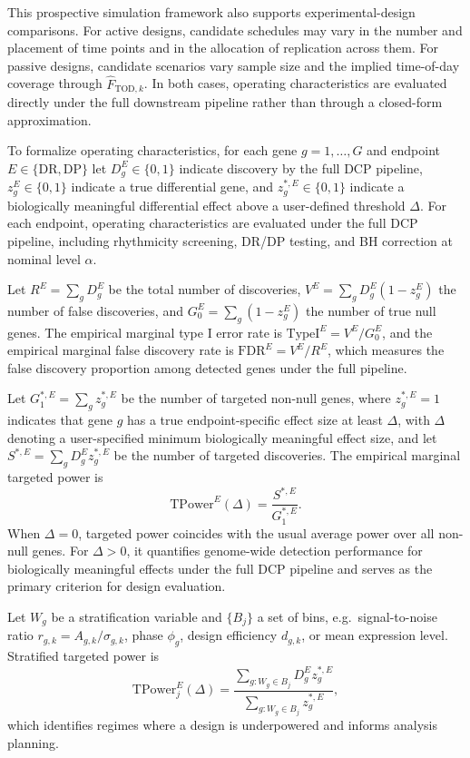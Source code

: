 \documentclass{article}
\begin{document}
This prospective simulation framework also supports experimental-design
comparisons. For active designs, candidate schedules may vary in the number and
placement of time points and in the allocation of replication across them. For
passive designs, candidate scenarios vary sample size and the implied
time-of-day coverage through $\hat{F}_{\mathrm{TOD},k}$. In both cases,
operating characteristics are evaluated directly under the full downstream
pipeline rather than through a closed-form approximation.

To formalize operating characteristics, for each gene $g=1,\ldots,G$ and
endpoint $E\in\{\mathrm{DR},\mathrm{DP}\}$ let $D_g^E\in\{0,1\}$ indicate
discovery by the full DCP pipeline, $z_g^E\in\{0,1\}$ indicate a true
differential gene, and $z_g^{*,E}\in\{0,1\}$ indicate a biologically
meaningful differential effect above a user-defined threshold $\Delta$.
For each endpoint, operating characteristics are evaluated under the full DCP
pipeline, including rhythmicity screening, DR/DP testing, and BH correction at
nominal level $\alpha$.

Let $R^E=\sum_g D_g^E$ be the total number of discoveries,
$V^E=\sum_g D_g^E(1-z_g^E)$ the number of false discoveries, and
$G_0^E=\sum_g(1-z_g^E)$ the number of true null genes.
The empirical marginal type I error rate is
\(\mathrm{TypeI}^E=V^E/G_0^E\),
and the empirical marginal false discovery rate is
\(\mathrm{FDR}^E=V^E/R^E\),
which measures the false discovery proportion among detected genes under the
full pipeline.

Let $G_1^{*,E}=\sum_g z_g^{*,E}$ be the number of targeted non-null genes,
where $z_g^{*,E}=1$ indicates that gene $g$ has a true endpoint-specific effect
size at least $\Delta$, with $\Delta$ denoting a user-specified minimum
biologically meaningful effect size, and let
$S^{*,E}=\sum_g D_g^E z_g^{*,E}$ be the number of targeted discoveries.
The empirical marginal targeted power is
\begin{equation}
\mathrm{TPower}^E(\Delta)=\frac{S^{*,E}}{G_1^{*,E}}.
\label{eq:tpower_def}
\end{equation}
When $\Delta=0$, targeted power coincides with the usual average power over all
non-null genes. For $\Delta>0$, it quantifies genome-wide detection
performance for biologically meaningful effects under the full DCP pipeline and
serves as the primary criterion for design evaluation.

Let $W_g$ be a stratification variable and $\{B_j\}$ a set of bins, e.g.\
signal-to-noise ratio $r_{g,k}=A_{g,k}/\sigma_{g,k}$, phase $\phi_g$, design
efficiency $d_{g,k}$, or mean expression level. Stratified targeted power is
\begin{equation}
\mathrm{TPower}_j^E(\Delta)
=
\frac{\sum_{g:W_g\in B_j} D_g^E z_g^{*,E}}
{\sum_{g:W_g\in B_j} z_g^{*,E}},
\label{eq:tpower_strat_def}
\end{equation}
which identifies regimes where a design is underpowered and informs analysis
planning.
\end{document}
